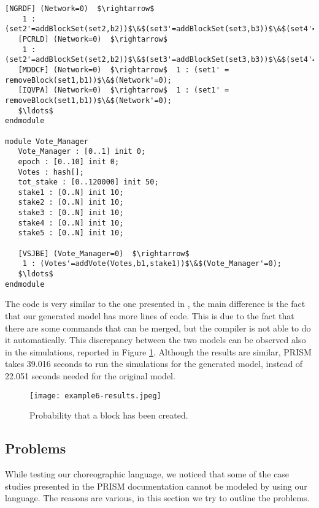 \begin{lstlisting}[style=prism-color,caption={Generated PRISM program for the Hybrid Casper	Protocol.},captionpos=b,label={ex5-gen}]
   [NGRDF] (Network=0)  $\rightarrow$  
   	1 : (set2'=addBlockSet(set2,b2))$\&$(set3'=addBlockSet(set3,b3))$\&$(set4'=addBlockSet(set4,b4))$\&$(set5'=addBlockSet(set5,b5))$\&$(Network'=0); 
   [PCRLD] (Network=0)  $\rightarrow$  
   	1 : (set2'=addBlockSet(set2,b2))$\&$(set3'=addBlockSet(set3,b3))$\&$(set4'=addBlockSet(set4,b4))$\&$(set5'=addBlockSet(set5,b5))$\&$(Network'=0); 
   [MDDCF] (Network=0)  $\rightarrow$  1 : (set1' = removeBlock(set1,b1))$\&$(Network'=0); 
   [IQVPA] (Network=0)  $\rightarrow$  1 : (set1' = removeBlock(set1,b1))$\&$(Network'=0); 
   $\ldots$
endmodule

module Vote_Manager
   Vote_Manager : [0..1] init 0;
   epoch : [0..10] init 0;
   Votes : hash[];  
   tot_stake : [0..120000] init 50; 
   stake1 : [0..N] init 10; 
   stake2 : [0..N] init 10; 
   stake3 : [0..N] init 10; 
   stake4 : [0..N] init 10; 
   stake5 : [0..N] init 10; 

   [VSJBE] (Vote_Manager=0)  $\rightarrow$  
   	1 : (Votes'=addVote(Votes,b1,stake1))$\&$(Vote_Manager'=0); 
   $\ldots$
endmodule

\end{lstlisting}

The code is very similar to the one presented in \cite{DBLP:journals/distribledger/GallettaLMV23},
the main difference is the fact that our generated model has more lines of code.
This is due to the fact that there are some commands that can be merged, but the compiler is not able to do it automatically.
This discrepancy between the two models can be observed also in the simulations, reported in Figure \ref{ex5-res}.
Although the results are similar, PRISM takes 39.016 seconds to run the simulations for the generated model, 
instead of 22.051 seconds needed for the original model.

\begin{figure}[h]
\centering
\texttt{[image: example6-results.jpeg]}	
\caption{Probability that a block has been created.}
\label{ex5-res}
\end{figure}



\subsection{Problems}
While testing our choreographic language, we noticed that some of the case studies presented in the 
PRISM documentation \cite{PRISMdoc} cannot be modeled by using our language.
The reasons are various, in this section we try to outline the problems.


